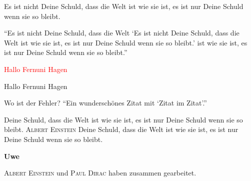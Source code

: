 \documentclass[12pt,ngerman]{scrartcl}
\newcommand{\dozent}{\textbf{Uwe}}
\newcommand{\person}[1]{\textcolor{fuh}{\textsc{#1}}}
\begin{document}
\glqq Es ist nicht Deine Schuld, dass die Welt ist wie sie ist, es ist nur Deine Schuld wenn sie so bleibt. \grqq

\enquote{Es ist nicht Deine Schuld, dass die Welt \enquote{Es ist nicht Deine Schuld, dass die Welt ist wie sie ist, es ist nur Deine Schuld wenn sie so bleibt.} ist wie sie ist, es ist nur Deine Schuld wenn sie so bleibt.}

\textcolor{red}{Hallo Fernuni Hagen}

\textcolor{fuh}{Hallo Fernuni Hagen}


Wo ist der Fehler? \enquote{Ein wunderschönes Zitat mit \enquote{Zitat im Zitat}.}

Deine Schuld, dass die Welt ist wie sie ist, es ist nur Deine Schuld wenn sie  so bleibt. \textcolor{fuh}{\textsc{Albert Einstein}} Deine Schuld, dass die Welt ist wie sie ist, es ist nur Deine Schuld wenn sie so bleibt.

\dozent

\person{Albert Einstein} und \person{Paul Dirac} haben zusammen gearbeitet.
\end{document}
